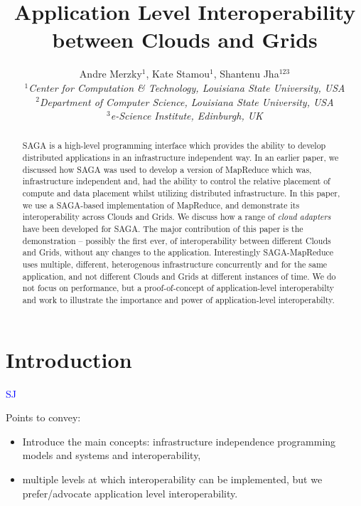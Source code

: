 \documentclass[conference,final]{IEEEtran}
\title{Application Level Interoperability between Clouds and Grids}
\author{Andre Merzky$^{1}$,  Kate Stamou$^{1}$, Shantenu Jha$^{123}$\\
  \small{\emph{$^{1}$Center for Computation \& Technology, Louisiana
      State University, USA}}\\
  \small{\emph{$^{2}$Department of Computer Science, Louisiana State
      University, USA}}\\
  \small{\emph{$^{3}$e-Science Institute, Edinburgh, UK}}\\
}
\newcommand{\sagamapreduce }{SAGA-MapReduce }
\begin{document}
\maketitle

\begin{abstract}
  SAGA is a high-level programming interface which provides the
  ability to develop distributed applications in an infrastructure
  independent way. In an earlier paper, we discussed how SAGA was used
  to develop a version of MapReduce which was, infrastructure
  independent and, had the ability to control the relative placement
  of compute and data placement whilst utilizing distributed
  infrastructure. In this paper, we use a SAGA-based implementation of
  MapReduce, and demonstrate its interoperability across Clouds and
  Grids.  We discuss how a range of {\it cloud adapters} have been
  developed for SAGA.  The major contribution of this paper is the
  demonstration -- possibly the first ever, of interoperability
  between different Clouds and Grids, without any changes to the
  application. Interestingly \sagamapreduce uses multiple, different,
  heterogenous infrastructure concurrently and for the same
  application, and not different Clouds and Grids at different
  instances of time.  We do not focus on performance, but a
  proof-of-concept of application-level interoperabilty and work to
  illustrate the importance and power of application-level
  interoperabilty.
\end{abstract}

\section{Introduction} {\textcolor{blue} {SJ}}


Points to convey:

\begin{itemize}
\item Introduce the main concepts: infrastructure independence
  programming models and systems and interoperability,
\item multiple levels at which interoperability can be implemented,
  but we prefer/advocate application level interoperability.
\end{itemize}
\end{document}
